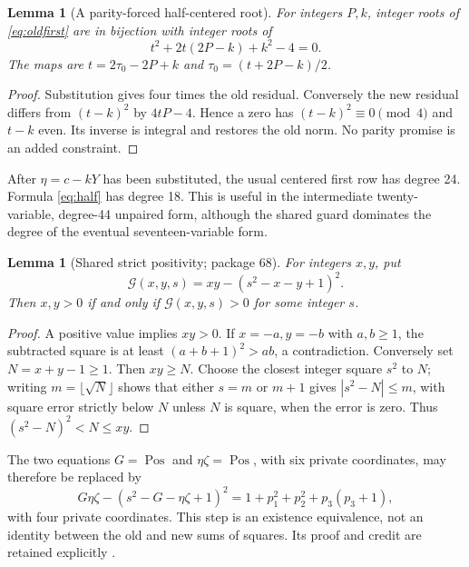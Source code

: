 \documentclass[11pt]{article}
\newtheorem{lemma}[theorem]{Lemma}
\theoremstyle{remark}\newtheorem{remark}[theorem]{Remark}
\newcommand{\Pos}{\operatorname{Pos}}
\begin{document}
\begin{lemma}[A parity-forced half-centered root]
\label{lem:half}
For integers $P,k$, integer roots of \eqref{eq:oldfirst} are in
bijection with integer roots of
\begin{equation}
 t^2+2t(2P-k)+k^2-4=0.                       \label{eq:half}
\end{equation}
The maps are $t=2\tau_0-2P+k$ and
$\tau_0=(t+2P-k)/2$.
\end{lemma}
\begin{proof}
Substitution gives four times the old residual. Conversely the new
residual differs from $(t-k)^2$ by $4tP-4$. Hence a zero has
$(t-k)^2\equiv0\pmod4$ and $t-k$ even. Its inverse is integral and
restores the old norm. No parity promise is an added constraint.
\end{proof}

After $\eta=c-kY$ has been substituted, the usual centered first row
has degree 24. Formula \eqref{eq:half} has degree 18. This is useful in
the intermediate twenty-variable, degree-44 unpaired form, although the
shared guard dominates the degree of the eventual seventeen-variable
form.

\begin{lemma}[Shared strict positivity; package 68]
\label{lem:pair}
For integers $x,y$, put
\[
 \mathcal G(x,y,s)=xy-(s^2-x-y+1)^2.
\]
Then $x,y>0$ if and only if $\mathcal G(x,y,s)>0$ for some integer $s$.
\end{lemma}
\begin{proof}
A positive value implies $xy>0$. If $x=-a,y=-b$ with $a,b\ge1$,
the subtracted square is at least $(a+b+1)^2>ab$, a contradiction.
Conversely set $N=x+y-1\ge1$. Then $xy\ge N$. Choose the closest
integer square $s^2$ to $N$; writing $m=\lfloor\sqrt N\rfloor$ shows
that either $s=m$ or $m+1$ gives $|s^2-N|\le m$, with square error
strictly below $N$ unless $N$ is square, when the error is zero.
Thus $(s^2-N)^2<N\le xy$.
\end{proof}

The two equations $G=\Pos$ and $\eta\zeta=\Pos$, with six private
coordinates, may therefore be replaced by
\begin{equation}
 G\eta\zeta-(s^2-G-\eta\zeta+1)^2
 =1+p_1^2+p_2^2+p_3(p_3+1),                  \label{eq:shared}
\end{equation}
with four private coordinates. This step is an existence equivalence,
not an identity between the old and new sums of squares. Its proof and
credit are retained explicitly \cite{source68}.
\end{document}
